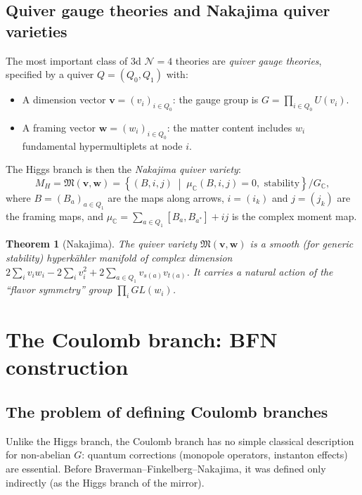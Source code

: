\documentclass[11pt]{article}
\newtheorem{theorem}{Theorem}[section]
\theoremstyle{definition}
\theoremstyle{remark}
\newcommand{\cN}{\mathcal{N}}
\begin{document}
\subsection{Quiver gauge theories and Nakajima quiver varieties}

The most important class of 3d $\cN=4$ theories are \emph{quiver gauge theories}, specified by a quiver $Q = (Q_0, Q_1)$ with:
\begin{itemize}
 \item A dimension vector $\mathbf{v} = (v_i)_{i \in Q_0}$: the gauge group is $G = \prod_{i \in Q_0} U(v_i)$.
 \item A framing vector $\mathbf{w} = (w_i)_{i \in Q_0}$: the matter content includes $w_i$ fundamental hypermultiplets at node $i$.
\end{itemize}

The Higgs branch is then the \emph{Nakajima quiver variety}:
\[
 M_H = \mathfrak{M}(\mathbf{v}, \mathbf{w}) = \left\{(B, i, j) \;\middle|\; \mu_{\mathbb{C}}(B,i,j) = 0, \text{ stability}\right\} / G_{\mathbb{C}},
\]
where $B = (B_a)_{a \in Q_1}$ are the maps along arrows, $i = (i_k)$ and $j = (j_k)$ are the framing maps, and $\mu_{\mathbb{C}} = \sum_{a \in Q_1} [B_a, B_{a^*}] + ij$ is the complex moment map.

\begin{theorem}[Nakajima]
\label{thm:nakajima}
The quiver variety $\mathfrak{M}(\mathbf{v}, \mathbf{w})$ is a smooth (for generic stability) hyperk\"ahler manifold of complex dimension $2\sum_i v_i w_i - 2\sum_i v_i^2 + 2\sum_{a \in Q_1} v_{s(a)} v_{t(a)}$. It carries a natural action of the ``flavor symmetry'' group $\prod_i GL(w_i)$.
\end{theorem}

\section{The Coulomb branch: BFN construction}
\label{sec:coulomb-bfn}

\subsection{The problem of defining Coulomb branches}

Unlike the Higgs branch, the Coulomb branch has no simple classical description for non-abelian $G$: quantum corrections (monopole operators, instanton effects) are essential. Before Braverman--Finkelberg--Nakajima, it was defined only indirectly (as the Higgs branch of the mirror).
\end{document}
